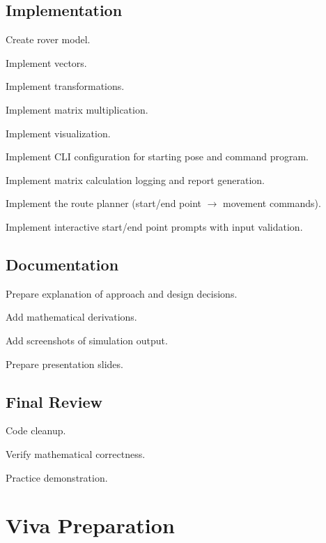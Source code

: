 \documentclass[12pt]{report}
\begin{document}
\section{Implementation}
\begin{checklist}
\item Create rover model.
\item Implement vectors.
\item Implement transformations.
\item Implement matrix multiplication.
\item Implement visualization.
\item Implement CLI configuration for starting pose and command program.
\item Implement matrix calculation logging and report generation.
\item Implement the route planner (start/end point $\to$ movement commands).
\item Implement interactive start/end point prompts with input validation.
\end{checklist}

\section{Documentation}
\begin{checklist}
\item Prepare explanation of approach and design decisions.
\item Add mathematical derivations.
\item Add screenshots of simulation output.
\item Prepare presentation slides.
\end{checklist}

\section{Final Review}
\begin{checklist}
\item Code cleanup.
\item Verify mathematical correctness.
\item Practice demonstration.
\end{checklist}

\chapter{Viva Preparation}
\end{document}
